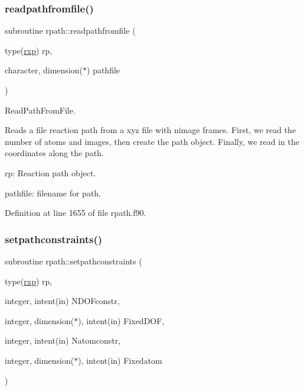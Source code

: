 \mbox{\label{namespacerpath_a06918a9ef3a6a733a078f2d7142ca2e3}} 
\subsubsection{\texorpdfstring{readpathfromfile()}{readpathfromfile()}}
{\footnotesize\ttfamily subroutine rpath\+::readpathfromfile (\begin{DoxyParamCaption}\item[{type(\mbox{\hyperlink{structrpath_1_1rxp}{rxp}})}]{rp,  }\item[{character, dimension($\ast$)}]{pathfile }\end{DoxyParamCaption})}



Read\+Path\+From\+File. 

Reads a file reaction path from a xyz file with nimage frames. First, we read the number of atoms and images, then create the path object. Finally, we read in the coordinates along the path.


\begin{DoxyItemize}
\item rp\+: Reaction path object.
\item pathfile\+: filename for path. 
\end{DoxyItemize}

Definition at line 1655 of file rpath.\+f90.

\mbox{\label{namespacerpath_afeb43b9e8aed2543261318d3585a0832}} 
\subsubsection{\texorpdfstring{setpathconstraints()}{setpathconstraints()}}
{\footnotesize\ttfamily subroutine rpath\+::setpathconstraints (\begin{DoxyParamCaption}\item[{type(\mbox{\hyperlink{structrpath_1_1rxp}{rxp}})}]{rp,  }\item[{integer, intent(in)}]{N\+D\+O\+Fconstr,  }\item[{integer, dimension($\ast$), intent(in)}]{Fixed\+D\+OF,  }\item[{integer, intent(in)}]{Natomconstr,  }\item[{integer, dimension($\ast$), intent(in)}]{Fixedatom }\end{DoxyParamCaption})}



